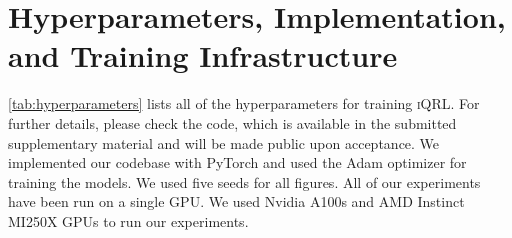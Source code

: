 \documentclass{article}
\theoremstyle{plain}
\theoremstyle{definition}
\theoremstyle{remark}
\newcommand{\our}{\textsc{iQRL}\xspace}
\begin{document}





\newpage
\appendix
\onecolumn

\section{Hyperparameters, Implementation, and Training Infrastructure}
\cref{tab:hyperparameters} lists all of the hyperparameters for training \our. For further details, please check the code, which is available in the submitted supplementary material and will be made public upon acceptance. We implemented our codebase with PyTorch and used the Adam optimizer for training the models. We used five seeds for all figures. All of our experiments have been run on a single GPU. We used Nvidia A100s and AMD Instinct MI250X GPUs to run our experiments.
\end{document}
